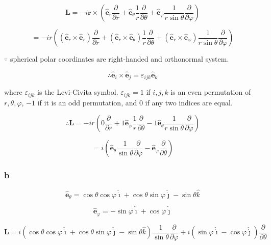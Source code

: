 \documentclass[12pt]{article}
\begin{document}
\[
    \textbf{L} = -i
    \textbf{r} \times
    \left(
    \hat{\textbf{e}}_r \frac{\partial}{\partial r}
    + \hat{\textbf{e}}_\theta \frac{1}{r} \frac{\partial}{\partial \theta}
    + \hat{\textbf{e}}_\varphi \frac{1}{r \sin{\theta}} \frac{\partial}{\partial \varphi}
    \right)
\]

\[
    = -i r
    \left(
    \left(\hat{\textbf{e}}_r \times \hat{\textbf{e}}_r\right)  \frac{\partial}{\partial r}
    + \left(\hat{\textbf{e}}_r \times \hat{\textbf{e}}_\theta\right)
    \frac{1}{r} \frac{\partial}{\partial \theta}
    + \left(\hat{\textbf{e}}_r \times \hat{\textbf{e}}_\varphi\right)
    \frac{1}{r \sin{\theta}} \frac{\partial}{\partial \varphi}
    \right)
\]

\(\because \) spherical polar coordinates are right-handed and orthonormal system.

\[
    \therefore \hat{\textbf{e}}_i \times \hat{\textbf{e}}_j = \varepsilon_{ijk} \hat{\textbf{e}}_k
\]

where \(\varepsilon_{ijk}\) is the Levi-Civita symbol.
\(\varepsilon_{ijk} = 1\) if \(i, j, k\) is an even permutation of \(r, \theta, \varphi \), \(-1\) if it
is an odd permutation, and 0 if any two indices are equal.

\[
    \therefore \textbf{L} = -i r
    \left(
    0  \frac{\partial}{\partial r}
    + 1 \hat{\textbf{e}}_\varphi
    \frac{1}{r} \frac{\partial}{\partial \theta}
    - 1 \hat{\textbf{e}}_\theta
    \frac{1}{r \sin{\theta}} \frac{\partial}{\partial \varphi}
    \right)
\]

\[
    = i
    \left(
    \hat{\textbf{e}}_\theta \frac{1}{\sin{\theta}} \frac{\partial}{\partial \varphi}
    - \hat{\textbf{e}}_\varphi \frac{\partial}{\partial \theta}
    \right)
\]

\subsubsection{b}

\[
    \hat{\textbf{e}}_\theta
    = \cos{\theta} \cos{\varphi} \hat{\dot{\imath}}
    + \cos{\theta} \sin{\varphi} \hat{\dot{\jmath}}
    - \sin{\theta} \hat{k}
\]

\[
    \hat{\textbf{e}}_\varphi
    = -\sin{\varphi} \hat{\dot{\imath}}
    + \cos{\varphi} \hat{\dot{\jmath}}
\]

\[
    \textbf{L} =
    i \left(
    \cos{\theta} \cos{\varphi} \hat{\dot{\imath}}
    + \cos{\theta} \sin{\varphi} \hat{\dot{\jmath}}
    - \sin{\theta} \hat{k}
    \right)
    \frac{1}{\sin{\theta}} \frac{\partial}{\partial \varphi}
    +i \left(
    \sin{\varphi} \hat{\dot{\imath}}
    -\cos{\varphi} \hat{\dot{\jmath}}
    \right)
    \frac{\partial}{\partial \theta}
\]
\end{document}
